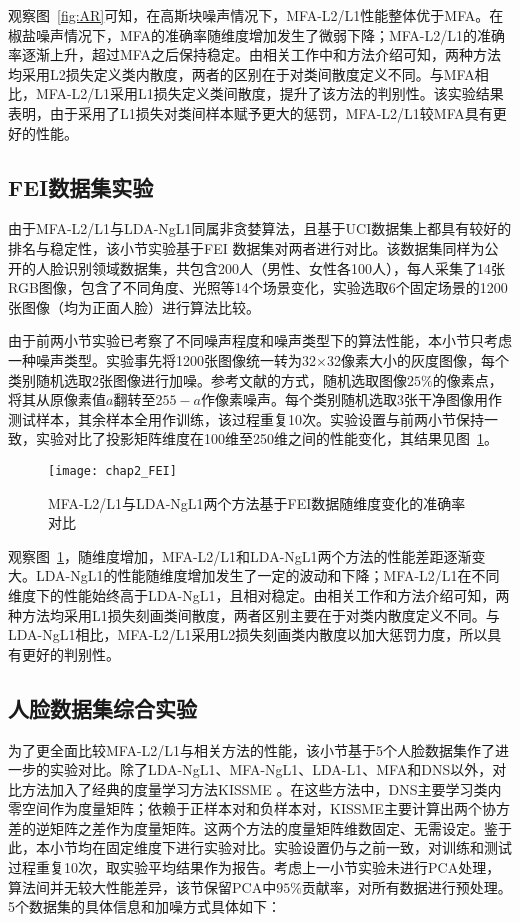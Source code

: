 观察图~\ref{fig:AR}可知，在高斯块噪声情况下，MFA-L2/L1性能整体优于MFA。在椒盐噪声情况下，MFA的准确率随维度增加发生了微弱下降；MFA-L2/L1的准确率逐渐上升，超过MFA之后保持稳定。由相关工作中和方法介绍可知，两种方法均采用L2损失定义类内散度，两者的区别在于对类间散度定义不同。与MFA相比，MFA-L2/L1采用L1损失定义类间散度，提升了该方法的判别性。该实验结果表明，由于采用了L1损失对类间样本赋予更大的惩罚，MFA-L2/L1较MFA具有更好的性能。

\subsection{FEI数据集实验} 
由于MFA-L2/L1与LDA-NgL1同属非贪婪算法，且基于UCI数据集上都具有较好的排名与稳定性，该小节实验基于FEI \citep{FEI10}数据集对两者进行对比。该数据集同样为公开的人脸识别领域数据集，共包含200人（男性、女性各100人），每人采集了14张RGB图像，包含了不同角度、光照等14个场景变化，实验选取6个固定场景的1200张图像（均为正面人脸）进行算法比较。

由于前两小节实验已考察了不同噪声程度和噪声类型下的算法性能，本小节只考虑一种噪声类型。实验事先将1200张图像统一转为32×32像素大小的灰度图像，每个类别随机选取2张图像进行加噪。参考文献\citep{chen2018robust}的方式，随机选取图像$25\%$的像素点，将其从原像素值$a$翻转至$255-a$作像素噪声。每个类别随机选取3张干净图像用作测试样本，其余样本全用作训练，该过程重复10次。实验设置与前两小节保持一致，实验对比了投影矩阵维度在100维至250维之间的性能变化，其结果见图~\ref{fig:FEI}。

\begin{figure}[htbp]
    \centering
    \texttt{[image: chap2\_FEI]}
    \caption{MFA-L2/L1与LDA-NgL1两个方法基于FEI数据随维度变化的准确率对比}
    \label{fig:FEI}
\end{figure}
           
观察图~\ref{fig:FEI}，随维度增加，MFA-L2/L1和LDA-NgL1两个方法的性能差距逐渐变大。LDA-NgL1的性能随维度增加发生了一定的波动和下降；MFA-L2/L1在不同维度下的性能始终高于LDA-NgL1，且相对稳定。由相关工作和方法介绍可知，两种方法均采用L1损失刻画类间散度，两者区别主要在于对类内散度定义不同。与LDA-NgL1相比，MFA-L2/L1采用L2损失刻画类内散度以加大惩罚力度，所以具有更好的判别性。

\subsection{人脸数据集综合实验} 
为了更全面比较MFA-L2/L1与相关方法的性能，该小节基于5个人脸数据集作了进一步的实验对比。除了LDA-NgL1、MFA-NgL1、LDA-L1、MFA和DNS以外，对比方法加入了经典的度量学习方法KISSME \citep{Kostinger2012}。在这些方法中，DNS主要学习类内零空间作为度量矩阵；依赖于正样本对和负样本对，KISSME主要计算出两个协方差的逆矩阵之差作为度量矩阵。这两个方法的度量矩阵维数固定、无需设定。鉴于此，本小节均在固定维度下进行实验对比。实验设置仍与之前一致，对训练和测试过程重复10次，取实验平均结果作为报告。考虑上一小节实验未进行PCA处理，算法间并无较大性能差异，该节保留PCA中$95\%$贡献率，对所有数据进行预处理。5个数据集的具体信息和加噪方式具体如下：

